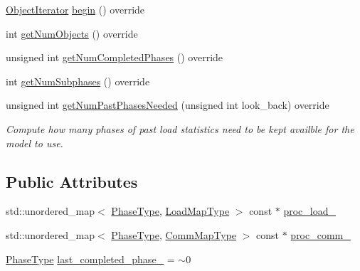 \begin{DoxyCompactItemize}
\hyperlink{structvt_1_1vrt_1_1collection_1_1balance_1_1_object_iterator}{Object\+Iterator} \hyperlink{structvt_1_1vrt_1_1collection_1_1balance_1_1_raw_data_a54351249212ade8b2d25a857e71b256f}{begin} () override
\item 
int \hyperlink{structvt_1_1vrt_1_1collection_1_1balance_1_1_raw_data_a586c3223d1f69ee9d5eb2930ff659051}{get\+Num\+Objects} () override
\item 
unsigned int \hyperlink{structvt_1_1vrt_1_1collection_1_1balance_1_1_raw_data_a151f3230094feacd15015f51980b8e9e}{get\+Num\+Completed\+Phases} () override
\item 
int \hyperlink{structvt_1_1vrt_1_1collection_1_1balance_1_1_raw_data_aeb7830328dfb72f11740e79eed6a23aa}{get\+Num\+Subphases} () override
\item 
unsigned int \hyperlink{structvt_1_1vrt_1_1collection_1_1balance_1_1_raw_data_a8f709c3aeaf10e92c746d773d7ba6f9c}{get\+Num\+Past\+Phases\+Needed} (unsigned int look\+\_\+back) override
\begin{DoxyCompactList}\small\item\em Compute how many phases of past load statistics need to be kept availble for the model to use. \end{DoxyCompactList}\end{DoxyCompactItemize}
\subsection*{Public Attributes}
\begin{DoxyCompactItemize}
\item 
std\+::unordered\+\_\+map$<$ \hyperlink{namespacevt_a46ce6733d5cdbd735d561b7b4029f6d7}{Phase\+Type}, \hyperlink{namespacevt_1_1vrt_1_1collection_1_1balance_a5339303db2e1ce964d783a53fd74e6b1}{Load\+Map\+Type} $>$ const  $\ast$ \hyperlink{structvt_1_1vrt_1_1collection_1_1balance_1_1_raw_data_a8ba841120376e38c83484365b57fc719}{proc\+\_\+load\+\_\+}
\item 
std\+::unordered\+\_\+map$<$ \hyperlink{namespacevt_a46ce6733d5cdbd735d561b7b4029f6d7}{Phase\+Type}, \hyperlink{namespacevt_1_1vrt_1_1collection_1_1balance_a01ee1fb0ae2da1d2ab7fdca3be9ae351}{Comm\+Map\+Type} $>$ const  $\ast$ \hyperlink{structvt_1_1vrt_1_1collection_1_1balance_1_1_raw_data_a1e350ebf1bd9b3c94fdbc371779b8832}{proc\+\_\+comm\+\_\+}
\item 
\hyperlink{namespacevt_a46ce6733d5cdbd735d561b7b4029f6d7}{Phase\+Type} \hyperlink{structvt_1_1vrt_1_1collection_1_1balance_1_1_raw_data_a9ceb9cf1dd88772821658e506d015397}{last\+\_\+completed\+\_\+phase\+\_\+} = $\sim$0
\end{DoxyCompactItemize}


